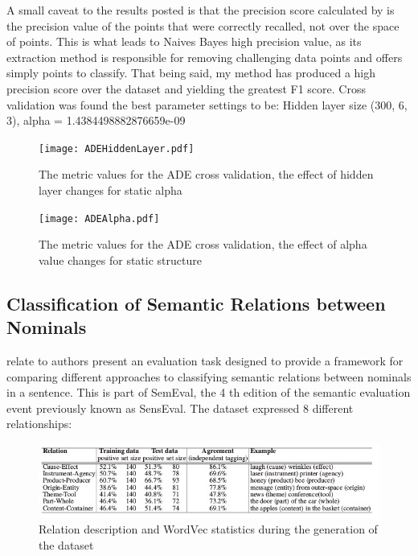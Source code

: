 \documentclass[12pt]{article} %
\begin{document}
A small caveat to the results posted is that the precision score calculated by \cite{gurulingappa2012development} is the precision value of the points that were correctly recalled, not over the space of points. This is what leads to Naives Bayes high precision value, as its extraction method is responsible for removing challenging data points and offers simply points to classify. That being said, my method has produced a high precision score over the dataset and yielding the greatest F1 score. Cross validation was found the best parameter settings to be: Hidden layer size (300, 6, 3), alpha = 1.4384498882876659e-09

\begin{figure}
\centering
\texttt{[image: ADEHiddenLayer.pdf]}
\caption{The metric values for the ADE cross validation, the effect of hidden layer changes for static alpha}
\end{figure}

\begin{figure}
\centering
\texttt{[image: ADEAlpha.pdf]}
\caption{The metric values for the ADE cross validation, the effect of alpha value changes for static structure}
\end{figure}

\subsection{Classification of Semantic Relations between Nominals}

\cite{girju2007semeval} relate to authors present an evaluation task designed to provide a framework for comparing different approaches to classifying semantic relations between nominals in a sentence. This is part of SemEval, the 4 th edition of the semantic evaluation event previously known as SensEval. The dataset expressed 8 different relationships:\\

\begin{figure}[h]
    \centering
    \includegraphics[scale=0.6]{WordVec.png}
    \caption{Relation description and WordVec statistics during the generation of the dataset}
\end{figure}
\end{document}
